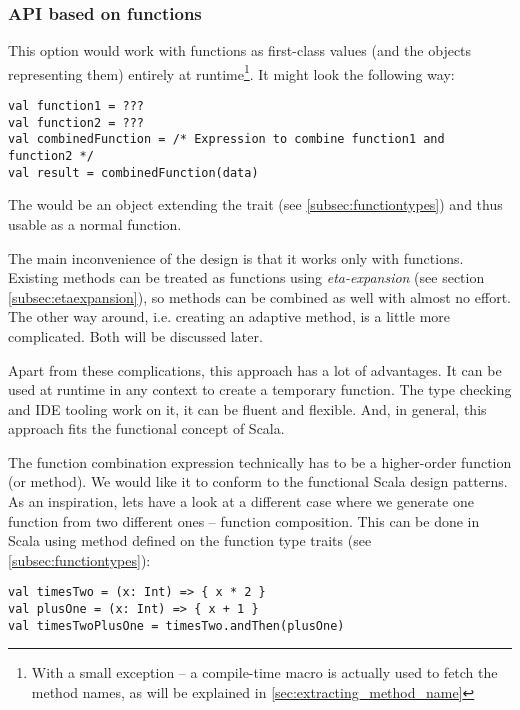 \subsubsection{API based on functions}

This option would work with functions as first-class values (and the objects representing them) entirely at runtime\footnote{With a small exception -- a compile-time macro is actually used to fetch the method names, as will be explained in \ref{sec:extracting_method_name}}. It might look the following way:

\lstset{style=Scala}
\begin{lstlisting}
val function1 = ???
val function2 = ???
val combinedFunction = /* Expression to combine function1 and function2 */
val result = combinedFunction(data)
\end{lstlisting}

The  would be an object extending the  trait (see \ref{subsec:functiontypes}) and thus usable as a normal function.

The main inconvenience of the design is that it works only with functions. Existing methods can be treated as functions using \textit{eta-expansion} (see section \ref{subsec:etaexpansion}), so methods can be combined as well with almost no effort. The other way around, i.e. creating an adaptive method, is a little more complicated. Both will be discussed later.

Apart from these complications, this approach has a lot of advantages. It can be used at runtime in any context to create a temporary function. The type checking and IDE tooling work on it, it can be fluent and flexible. And, in general, this approach fits the functional concept of Scala.

The function combination expression technically has to be a higher-order function (or method). We would like it to conform to the functional Scala design patterns. As an inspiration, lets have a look at a different case where we generate one function from two different ones -- function composition. This can be done in Scala using  method defined on the function type traits (see \ref{subsec:functiontypes}):

\lstset{style=Scala}
\begin{lstlisting}
val timesTwo = (x: Int) => { x * 2 }
val plusOne = (x: Int) => { x + 1 }
val timesTwoPlusOne = timesTwo.andThen(plusOne)
\end{lstlisting}

